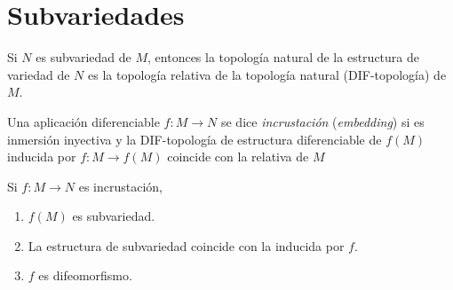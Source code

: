 \documentclass[../VD.tex]{subfiles}
\begin{document}
\setcounter{chapter}{2}
\chapter{Subvariedades}\label{chap:subvd}

\begin{lemma}
  Si \(N\) es subvariedad de \(M\), entonces la topología natural de la
  estructura de variedad de \(N\) es la topología relativa de la topología
  natural (DIF-topología) de \(M\).
\end{lemma}

\begin{definition}
  Una aplicación diferenciable \(f \colon M \to N\) se dice \emph{incrustación}
  (\emph{embedding}) si es inmersión inyectiva y la DIF-topología de estructura
  diferenciable de \(f(M)\) inducida por \(f \colon M \to f(M)\) coincide con la
  relativa de \(M\)
\end{definition}

\begin{lemma}
  Si \(f \colon M \to N\) es incrustación,
  \begin{enumerate}
  \item \(f(M)\) es subvariedad.
  \item La estructura de subvariedad coincide con la inducida por \(f\).
  \item \(f\) es difeomorfismo.
  \end{enumerate}
\end{lemma}
\end{document}
